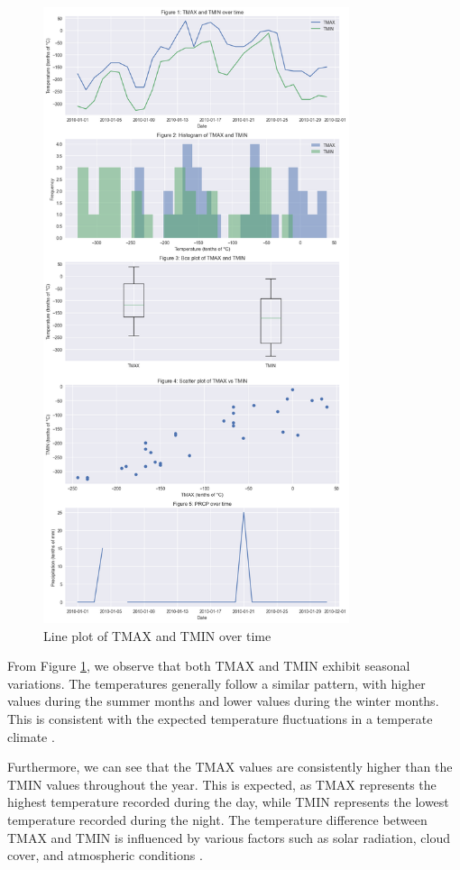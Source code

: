 \documentclass{article}
\begin{document}
\begin{figure}[h]
  \centering
  \includegraphics[width=0.8\textwidth]{figure_0.png}
  \caption{Line plot of TMAX and TMIN over time}
  \label{fig:temp_over_time}
\end{figure}

From Figure \ref{fig:temp_over_time}, we observe that both TMAX and TMIN exhibit seasonal variations. The temperatures generally follow a similar pattern, with higher values during the summer months and lower values during the winter months. This is consistent with the expected temperature fluctuations in a temperate climate \cite{smith2010climate}.

Furthermore, we can see that the TMAX values are consistently higher than the TMIN values throughout the year. This is expected, as TMAX represents the highest temperature recorded during the day, while TMIN represents the lowest temperature recorded during the night. The temperature difference between TMAX and TMIN is influenced by various factors such as solar radiation, cloud cover, and atmospheric conditions \cite{miller2012principles}.
\end{document}
